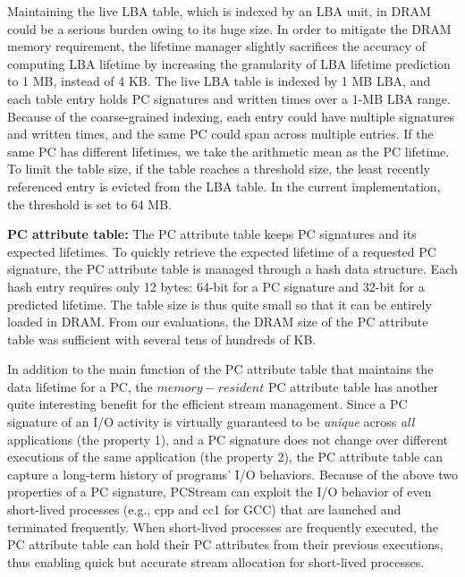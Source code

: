 Maintaining the live LBA table, which is indexed by an LBA unit,
in DRAM could be a serious burden owing to its
huge size. In order to mitigate the DRAM memory requirement, 
the lifetime manager slightly sacrifices
the accuracy of computing LBA lifetime by increasing the 
granularity of LBA lifetime prediction to 1 MB, instead of 4 KB.  The
live LBA table is indexed by 1 MB LBA, and each table entry holds PC
signatures and written times over a 1-MB LBA range. 
Because of the coarse-grained indexing, each entry
could have multiple signatures and written times, and the same PC could span
across multiple entries.  If the same PC has different lifetimes, we take the
arithmetic mean as the PC lifetime. 
To limit the table size, if the table reaches a
threshold size, the least recently referenced entry is evicted from 
the LBA table.
In the current implementation, the threshold is set to 64 MB.

\textbf{PC attribute table:}
The PC attribute table keeps PC signatures and its expected lifetimes. To quickly
retrieve the expected lifetime of a requested PC signature, 
the PC attribute table is managed
through a hash data structure. Each hash entry requires only 12 bytes: 64-bit
for a PC signature and 32-bit for a predicted lifetime.  The table size is thus
quite small so that it can be entirely loaded in DRAM. 
From our evaluations, the DRAM size of the PC attribute table was sufficient 
with several tens of hundreds of KB.

In addition to the main function of the PC attribute table that maintains 
the data lifetime for a PC, the $memory-resident$ PC attribute table has 
another quite interesting benefit for the efficient
stream management.  Since a PC signature of an I/O activity is virtually 
guaranteed to be {\it unique} across {\it all} applications (the property 1),  
and a PC signature does not change over different executions of the same 
application (the property 2), the PC attribute table can capture a long-term 
history of programs' I/O behaviors.  
Because of the above two properties of a PC signature, \textsf{\small PCStream} can 
exploit the I/O behavior of even short-lived processes 
(e.g., cpp and cc1 for GCC)  that are launched and terminated frequently.  
When short-lived processes are frequently executed, the PC attribute table 
can hold their PC attributes from their previous executions, 
thus enabling quick but accurate stream allocation for short-lived
processes.

